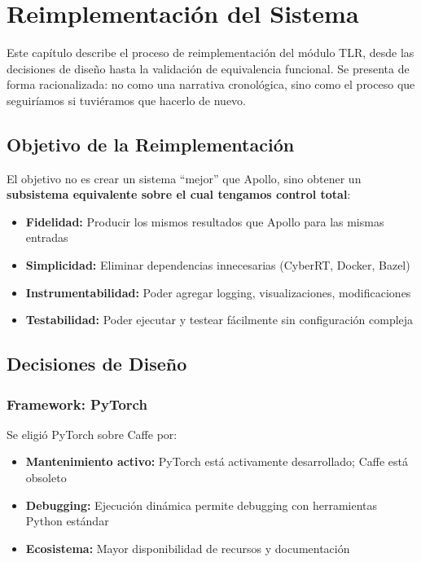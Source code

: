 \chapter{Reimplementación del Sistema}
\label{cap:reimplementacion}

Este capítulo describe el proceso de reimplementación del módulo TLR, desde las decisiones de diseño hasta la validación de equivalencia funcional. Se presenta de forma racionalizada: no como una narrativa cronológica, sino como el proceso que seguiríamos si tuviéramos que hacerlo de nuevo.

\section{Objetivo de la Reimplementación}

El objetivo no es crear un sistema ``mejor'' que Apollo, sino obtener un \textbf{subsistema equivalente sobre el cual tengamos control total}:

\begin{itemize}
    \item \textbf{Fidelidad:} Producir los mismos resultados que Apollo para las mismas entradas
    \item \textbf{Simplicidad:} Eliminar dependencias innecesarias (CyberRT, Docker, Bazel)
    \item \textbf{Instrumentabilidad:} Poder agregar logging, visualizaciones, modificaciones
    \item \textbf{Testabilidad:} Poder ejecutar y testear fácilmente sin configuración compleja
\end{itemize}

\section{Decisiones de Diseño}

\subsection{Framework: PyTorch}

Se eligió PyTorch sobre Caffe por:

\begin{itemize}
    \item \textbf{Mantenimiento activo:} PyTorch está activamente desarrollado; Caffe está obsoleto
    \item \textbf{Debugging:} Ejecución dinámica permite debugging con herramientas Python estándar
    \item \textbf{Ecosistema:} Mayor disponibilidad de recursos y documentación
\end{itemize}

